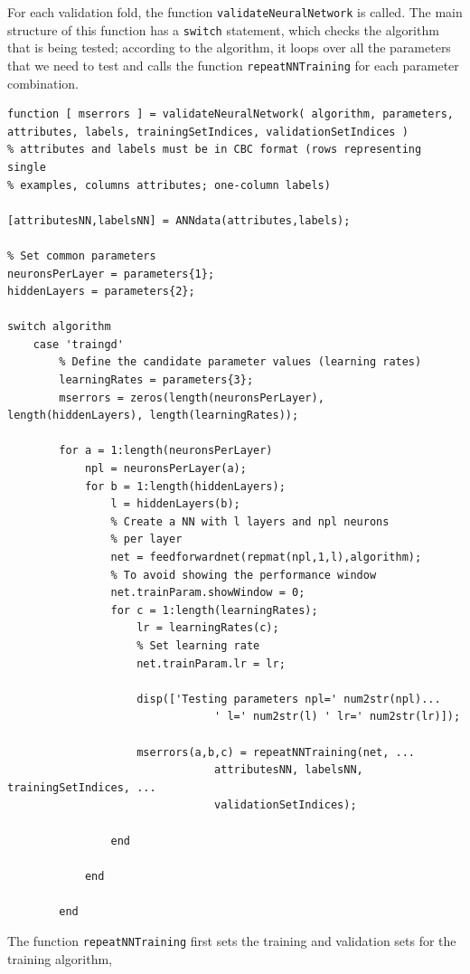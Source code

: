 \documentclass{article}
\begin{document}
For each validation fold, the function \verb$validateNeuralNetwork$ is called. The main structure of this function has a \verb$switch$ statement, which checks the algorithm that is being tested; according to the algorithm, it loops over all the parameters that we need to test and calls the function \verb$repeatNNTraining$ for each parameter combination.
\begin{lstlisting}[breaklines=true]
function [ mserrors ] = validateNeuralNetwork( algorithm, parameters, attributes, labels, trainingSetIndices, validationSetIndices )
% attributes and labels must be in CBC format (rows representing single
% examples, columns attributes; one-column labels)

[attributesNN,labelsNN] = ANNdata(attributes,labels);

% Set common parameters
neuronsPerLayer = parameters{1};
hiddenLayers = parameters{2};

switch algorithm
    case 'traingd'
        % Define the candidate parameter values (learning rates)
        learningRates = parameters{3};
        mserrors = zeros(length(neuronsPerLayer), length(hiddenLayers), length(learningRates));
        
        for a = 1:length(neuronsPerLayer)
            npl = neuronsPerLayer(a);
            for b = 1:length(hiddenLayers);
                l = hiddenLayers(b);
                % Create a NN with l layers and npl neurons
                % per layer
                net = feedforwardnet(repmat(npl,1,l),algorithm);
                % To avoid showing the performance window
                net.trainParam.showWindow = 0;
                for c = 1:length(learningRates);
                    lr = learningRates(c);
                    % Set learning rate
                    net.trainParam.lr = lr;
                    
                    disp(['Testing parameters npl=' num2str(npl)...
                                ' l=' num2str(l) ' lr=' num2str(lr)]);

                    mserrors(a,b,c) = repeatNNTraining(net, ...
                                attributesNN, labelsNN, trainingSetIndices, ...
                                validationSetIndices);
                    
                end
                
            end
            
        end
\end{lstlisting}
The function \verb$repeatNNTraining$ first sets the training and validation sets for the training algorithm,
\end{document}
